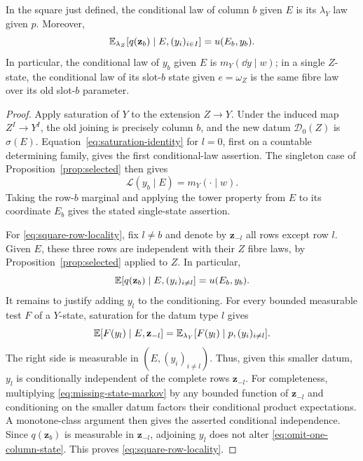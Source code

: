 \begin{lemma}\label{lem:square-conditional}
In the square just defined, the conditional law of column $b$ given
$E$ is its $\lambda_Y$ law given $p$. Moreover,
\begin{equation}\label{eq:square-row-locality}
 \mathbb E_{\lambda_Z}[q(\mathbf z_b)\mid E,(y_i)_{i\in I}]
       =u(E_b,y_b).
\end{equation}
In particular, the conditional law of $y_b$ given $E$ is
$m_Y(\dd y\mid w)$; in a single $Z$-state, the conditional law of its
slot-$b$ state given $e=\omega_Z$ is the same fibre law over its old
slot-$b$ parameter.
\end{lemma}

\begin{proof}
Apply saturation of $Y$ to the extension $Z\to Y$. Under the induced
map $Z^I\to Y^I$, the old joining is precisely column $b$, and the new
datum $\mathcal D_0(Z)$ is $\sigma(E)$. Equation~\eqref{eq:saturation-identity}
for $l=0$, first on a countable determining family, gives the first
conditional-law assertion. The singleton case of
Proposition~\ref{prop:selected} then gives
\begin{equation}\label{eq:corner-fibre-law}
 \mathcal L(y_b\mid E)=m_Y(\cdot\mid w).
\end{equation}
Taking the row-$b$ marginal and applying the tower property from $E$
to its coordinate $E_b$ gives
the stated single-state assertion.

For \eqref{eq:square-row-locality}, fix $l\ne b$ and denote by
$\mathbf z_{-l}$ all rows except row $l$. Given $E$, these three rows
are independent with their $Z$ fibre laws, by
Proposition~\ref{prop:selected} applied to $Z$. In particular,
\begin{equation}\label{eq:omit-one-column-state}
 \mathbb E[q(\mathbf z_b)\mid E,(y_i)_{i\ne l}]=u(E_b,y_b).
\end{equation}
It remains to justify adding $y_l$ to the conditioning. For every
bounded measurable test $F$ of a $Y$-state, saturation for the datum
type $l$ gives
\begin{equation}\label{eq:missing-state-markov}
 \mathbb E[F(y_l)\mid E,\mathbf z_{-l}]
 =\mathbb E_{\lambda_Y}[F(y_l)\mid p,(y_i)_{i\ne l}].
\end{equation}
The right side is measurable in $(E,(y_i)_{i\ne l})$. Thus, given this
smaller datum, $y_l$ is conditionally independent of the complete rows
$\mathbf z_{-l}$. For completeness, multiplying
\eqref{eq:missing-state-markov} by any bounded function of
$\mathbf z_{-l}$ and conditioning on the smaller datum factors their
conditional product expectations. A monotone-class argument then gives
the asserted conditional independence. Since $q(\mathbf z_b)$ is
measurable in $\mathbf z_{-l}$, adjoining $y_l$ does not alter
\eqref{eq:omit-one-column-state}. This proves
\eqref{eq:square-row-locality}.
\end{proof}


